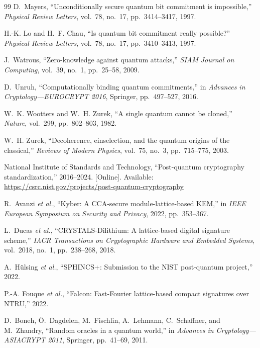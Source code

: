 \documentclass{ieeeaccess}
\begin{document}
\begin{thebibliography}{99}
D.~Mayers, ``Unconditionally secure quantum bit commitment is impossible,''
\emph{Physical Review Letters}, vol.~78, no.~17, pp.~3414--3417, 1997.

H.-K. Lo and H.~F. Chau, ``Is quantum bit commitment really possible?''
\emph{Physical Review Letters}, vol.~78, no.~17, pp.~3410--3413, 1997.

J.~Watrous, ``Zero-knowledge against quantum attacks,''
\emph{SIAM Journal on Computing}, vol.~39, no.~1, pp.~25--58, 2009.

D.~Unruh, ``Computationally binding quantum commitments,''
in \emph{Advances in Cryptology---EUROCRYPT 2016}, Springer, pp.~497--527, 2016.

W.~K. Wootters and W.~H. Zurek, ``A single quantum cannot be cloned,''
\emph{Nature}, vol.~299, pp.~802--803, 1982.

W.~H. Zurek, ``Decoherence, einselection, and the quantum origins of the classical,''
\emph{Reviews of Modern Physics}, vol.~75, no.~3, pp.~715--775, 2003.

National Institute of Standards and Technology, ``Post-quantum cryptography
standardization,'' 2016--2024. [Online]. Available:
\url{https://csrc.nist.gov/projects/post-quantum-cryptography}

R.~Avanzi \textit{et al.}, ``Kyber: A CCA-secure module-lattice-based KEM,''
in \emph{IEEE European Symposium on Security and Privacy}, 2022, pp.~353--367.

L.~Ducas \textit{et al.}, ``CRYSTALS-Dilithium: A lattice-based digital signature
scheme,'' \emph{IACR Transactions on Cryptographic Hardware and Embedded Systems},
vol.~2018, no.~1, pp.~238--268, 2018.

A.~Hülsing \textit{et al.}, ``SPHINCS+: Submission to the NIST post-quantum project,'' 2022.

P.-A. Fouque \textit{et al.}, ``Falcon: Fast-Fourier lattice-based compact signatures
over NTRU,'' 2022.

D.~Boneh, Ö.~Dagdelen, M.~Fischlin, A.~Lehmann, C.~Schaffner, and M.~Zhandry,
``Random oracles in a quantum world,'' in \emph{Advances in Cryptology---ASIACRYPT 2011},
Springer, pp.~41--69, 2011.


\end{thebibliography}
\end{document}
